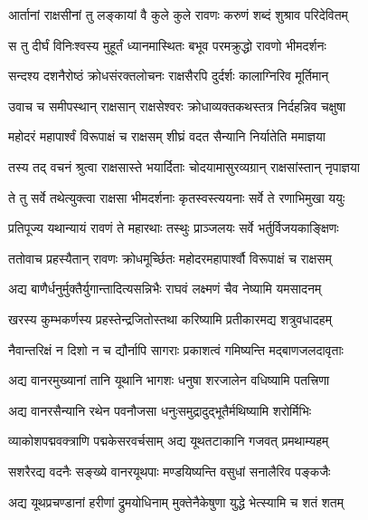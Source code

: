
\twolineshloka
{आर्तानां राक्षसीनां तु लङ्कायां वै कुले कुले}
{रावणः करुणं शब्दं शुश्राव परिदेवितम्} %

\twolineshloka
{स तु दीर्घं विनिःश्वस्य मुहूर्तं ध्यानमास्थितः}
{बभूव परमक्रुद्धो रावणो भीमदर्शनः} %

\twolineshloka
{सन्दश्य दशनैरोष्ठं क्रोधसंरक्तलोचनः}
{राक्षसैरपि दुर्दर्शः कालाग्निरिव मूर्तिमान्} %

\twolineshloka
{उवाच च समीपस्थान् राक्षसान् राक्षसेश्वरः}
{क्रोधाव्यक्तकथस्तत्र निर्दहन्निव चक्षुषा} %

\twolineshloka
{महोदरं महापार्श्वं विरूपाक्षं च राक्षसम्}
{शीघ्रं वदत सैन्यानि निर्यातेति ममाज्ञया} %

\twolineshloka
{तस्य तद् वचनं श्रुत्वा राक्षसास्ते भयार्दिताः}
{चोदयामासुरव्यग्रान् राक्षसांस्तान् नृपाज्ञया} %

\twolineshloka
{ते तु सर्वे तथेत्युक्त्वा राक्षसा भीमदर्शनाः}
{कृतस्वस्त्ययनाः सर्वे ते रणाभिमुखा ययुः} %

\twolineshloka
{प्रतिपूज्य यथान्यायं रावणं ते महारथाः}
{तस्थुः प्राञ्जलयः सर्वे भर्तुर्विजयकाङ्क्षिणः} %

\twolineshloka
{ततोवाच प्रहस्यैतान् रावणः क्रोधमूर्च्छितः}
{महोदरमहापार्श्वौ विरूपाक्षं च राक्षसम्} %

\twolineshloka
{अद्य बाणैर्धनुर्मुक्तैर्युगान्तादित्यसन्निभैः}
{राघवं लक्ष्मणं चैव नेष्यामि यमसादनम्} %

\twolineshloka
{खरस्य कुम्भकर्णस्य प्रहस्तेन्द्रजितोस्तथा}
{करिष्यामि प्रतीकारमद्य शत्रुवधादहम्} %

\twolineshloka
{नैवान्तरिक्षं न दिशो न च द्यौर्नापि सागराः}
{प्रकाशत्वं गमिष्यन्ति मद्बाणजलदावृताः} %

\twolineshloka
{अद्य वानरमुख्यानां तानि यूथानि भागशः}
{धनुषा शरजालेन वधिष्यामि पतत्त्रिणा} %

\twolineshloka
{अद्य वानरसैन्यानि रथेन पवनौजसा}
{धनुःसमुद्रादुद्भूतैर्मथिष्यामि शरोर्मिभिः} %

\twolineshloka
{व्याकोशपद्मवक्त्राणि पद्मकेसरवर्चसाम्}
{अद्य यूथतटाकानि गजवत् प्रमथाम्यहम्} %

\twolineshloka
{सशरैरद्य वदनैः सङ्ख्ये वानरयूथपाः}
{मण्डयिष्यन्ति वसुधां सनालैरिव पङ्कजैः} %

\twolineshloka
{अद्य यूथप्रचण्डानां हरीणां द्रुमयोधिनाम्}
{मुक्तेनैकेषुणा युद्धे भेत्स्यामि च शतं शतम्} %

